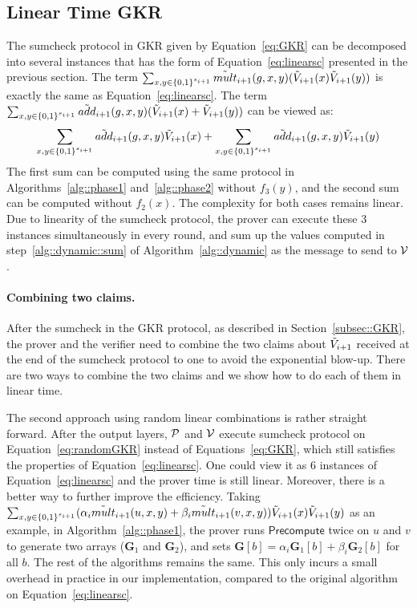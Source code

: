 \subsection{Linear Time GKR}

The sumcheck protocol in GKR given by Equation~\ref{eq:GKR} can be decomposed into several instances that has the form of Equation~\ref{eq:linearsc} presented in the previous section. The term $\sum_{x,y\in\binary^{s_{i+1}}}\tmult_{i+1}(g,x,y)(\tV_{i+1}(x)\tV_{i+1}(y))$ is exactly the same as Equation~\ref{eq:linearsc}.  The term $\sum_{x,y\in\binary^{s_{i+1}}}\tadd_{i+1}(g,x,y)(\tV_{i+1}(x)+\tV_{i+1}(y))$ can be viewed as: 
\[
\sum_{x,y\in\binary^{s_{i+1}}}\tadd_{i+1}(g,x,y)\tV_{i+1}(x)+\sum_{x,y\in\binary^{s_{i+1}}}\tadd_{i+1}(g,x,y)\tV_{i+1}(y)
\]
The first sum can be computed using the same protocol in Algorithms~\ref{alg::phase1} and~\ref{alg::phase2} without $f_3(y)$, and the second sum can be computed without $f_2(x)$. The complexity for both cases remains linear. Due to linearity of the sumcheck protocol, the prover can execute these 3 instances simultaneously in every round, and sum up the values computed in step~\ref{alg::dynamic::sum} of Algorithm~\ref{alg::dynamic} as the message to send to $\V$.



\paragraph{Combining two claims.} After the sumcheck in the GKR protocol, as described in Section~\ref{subsec::GKR}, the prover and the verifier need to combine the two claims about $\tV_{i+1}$ received at the end of the sumcheck protocol to one to avoid the exponential blow-up. There are two ways to combine the two claims and we show how to do each of them in linear time. 

The second approach using random linear combinations is rather straight forward. After the output layers, $\P$ and $\V$ execute sumcheck protocol on Equation~\ref{eq:randomGKR} instead of Equations~\ref{eq:GKR}, which still satisfies the properties of Equation~\ref{eq:linearsc}. One could view it as 6 instances of Equation~\ref{eq:linearsc} and the prover time is still linear. Moreover, there is a better way to further improve the efficiency. Taking $\sum_{x, y \in\binary^{s_{i+1}}}(\alpha_i\tmult_{i+1}(u,x,y)+\beta_i\tmult_{i+1}(v,x,y))\tV_{i+1}(x)\tV_{i+1}(y)$ as an example, in Algorithm~\ref{alg::phase1}, the prover runs $\mathsf{Precompute}$ twice on $u$ and $v$ to generate two arrays ($\textbf{G}_1$ and $\textbf{G}_2$), and sets $\textbf{G}[b]=\alpha_i \textbf{G}_1[b] + \beta_i\textbf{G}_2[b]$ for all $b$. The rest of the algorithms remains the same. This only incurs a small overhead in practice in our implementation, compared to the original algorithm on Equation~\ref{eq:linearsc}.

